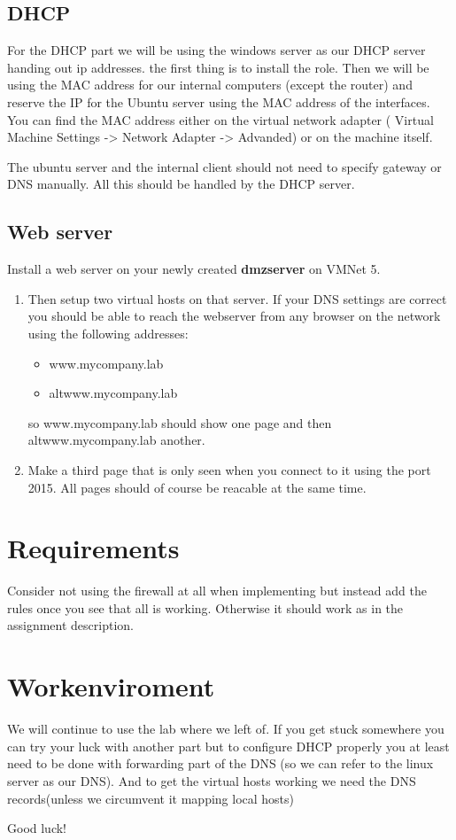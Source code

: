 \documentclass[paper=a4, fontsize=11pt]{report} %
\begin{document}
\subsection{DHCP}
For the DHCP part we will be using the windows server as our DHCP server handing out ip addresses. the first thing is to install the role. Then we will be using the MAC address for our internal computers (except the router) and reserve the IP for the Ubuntu server using the MAC address of the interfaces. You can find the MAC address either on the virtual network adapter ( Virtual Machine Settings -> Network Adapter -> Advanded) or on the machine itself.

The ubuntu server and the internal client should not need to specify gateway or DNS manually. All this should be handled by the DHCP server.

\subsection{Web server}
Install a web server on your newly created \textbf{dmzserver} on VMNet 5.
\begin{enumerate}
	\item Then setup two virtual hosts on that server. If your DNS settings are correct you should be able to reach the webserver from any browser on the network using the following addresses:
		\begin{itemize}
			\item www.mycompany.lab
			\item altwww.mycompany.lab
		\end{itemize}
		so www.mycompany.lab should show one page and then altwww.mycompany.lab another.
	\item Make a third page that is only seen when you connect to it using the port 2015.
		All pages should of course be reacable at the same time.
\end{enumerate}


\section{Requirements}
Consider not using the firewall at all when implementing but instead add the rules once you see that all is working. Otherwise it should work as in the assignment description. 

\section{Workenviroment}
\label{enviroment}
We will continue to use the lab where we left of. If you get stuck somewhere you can try your luck with another part but to configure DHCP properly you at least need to be done with forwarding part of the DNS (so we can refer to the linux server as our DNS). And to get the virtual hosts working we need the DNS records(unless we circumvent it mapping local hosts)

Good luck!
\end{document}
